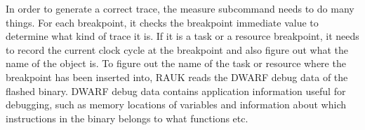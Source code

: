 In order to generate a correct trace, the measure subcommand needs to do many
things. For each breakpoint, it checks the breakpoint immediate value to
determine what kind of trace it is. If it is a task or a resource breakpoint, it
needs to record the current clock cycle at the breakpoint and also figure out
what the name of the object is. To figure out the name of the task or resource
where the breakpoint has been inserted into, RAUK reads the
DWARF\cite{dwarfspec} debug data of the flashed binary. DWARF debug data
contains application information useful for debugging, such as memory
locations of variables and information about which instructions in the binary
belongs to what functions etc.

%
%
%
%
%

